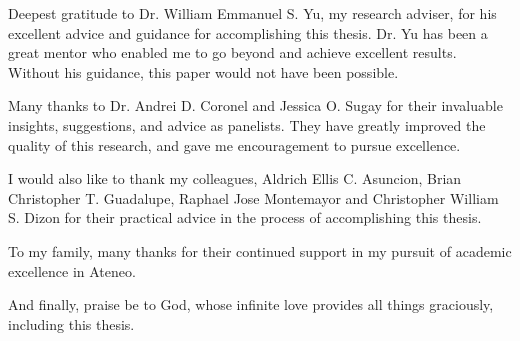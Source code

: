 \begin{acknowledgments}
\noindent Deepest gratitude to Dr. William Emmanuel S. Yu, my research adviser, for his excellent advice and guidance for accomplishing this thesis. Dr. Yu has been a great mentor who enabled me to go beyond and achieve excellent results. Without his guidance, this paper would not have been possible.

Many thanks to Dr. Andrei D. Coronel and Jessica O. Sugay for their invaluable insights, suggestions, and advice as panelists. They have greatly improved the quality of this research, and gave me encouragement to pursue excellence.

I would also like to thank my colleagues, Aldrich Ellis C. Asuncion, Brian Christopher T. Guadalupe, Raphael Jose Montemayor and Christopher William S. Dizon for their practical advice in the process of accomplishing this thesis.

To my family, many thanks for their continued support in my pursuit of academic excellence in Ateneo.

And finally, praise be to God, whose infinite love provides all things graciously, including this thesis.
\end{acknowledgments}
